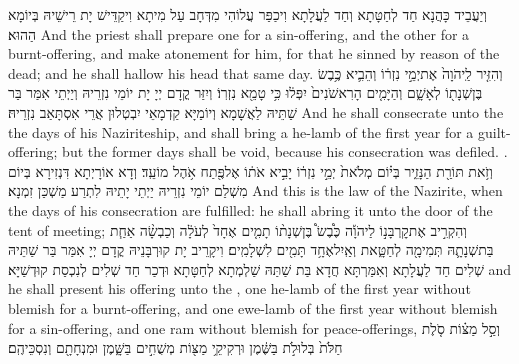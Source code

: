{וְיַעֲבֵיד כָּהֲנָא חַד לְחַטָּתָא וְחַד לַעֲלָתָא וִיכַפַּר עֲלוֹהִי מִדְּחָב עַל מִיתָא וִיקַדֵּישׁ יָת רֵישֵׁיהּ בְּיוֹמָא הַהוּא׃}
{And the priest shall prepare one for a sin-offering, and the other for a burnt-offering, and make atonement for him, for that he sinned by reason of the dead; and he shall hallow his head that same day.}{}
{וְהִזִּ֤יר לַֽיהֹוָה֙ אֶת\maqqaf יְמֵ֣י נִזְר֔וֹ וְהֵבִ֛יא כֶּ֥בֶשׂ בֶּן\maqqaf שְׁנָת֖וֹ לְאָשָׁ֑ם וְהַיָּמִ֤ים הָרִאשֹׁנִים֙ יִפְּל֔וּ כִּ֥י טָמֵ֖א נִזְרֽוֹ׃}
{וְיִזַּר קֳדָם יְיָ יָת יוֹמֵי נִזְרֵיהּ וְיַיְתֵי אִמַּר בַּר שַׁתֵּיהּ לַאֲשָׁמָא וְיוֹמַיָּא קַדְמָאֵי יִבְטְלוּן אֲרֵי אִסְתָּאַב נִזְרֵיהּ׃}
{And he shall consecrate unto the \lord\space the days of his Naziriteship, and shall bring a he-lamb of the first year for a guilt-offering; but the former days shall be void, because his consecration was defiled. .}{}
{וְזֹ֥את תּוֹרַ֖ת הַנָּזִ֑יר בְּי֗וֹם מְלֹאת֙ יְמֵ֣י נִזְר֔וֹ יָבִ֣יא אֹת֔וֹ אֶל\maqqaf פֶּ֖תַח אֹ֥הֶל מוֹעֵֽד׃}
{וְדָא אוֹרָיְתָא דִּנְזִירָא בְּיוֹם מִשְׁלַם יוֹמֵי נִזְרֵיהּ יַיְתֵי יָתֵיהּ לִתְרַע מַשְׁכַּן זִמְנָא׃}
{And this is the law of the Nazirite, when the days of his consecration are fulfilled: he shall abring it unto the door of the tent of meeting;}{}
{וְהִקְרִ֣יב אֶת\maqqaf קׇרְבָּנ֣וֹ לַיהֹוָ֡ה כֶּ֩בֶשׂ֩ בֶּן\maqqaf שְׁנָת֨וֹ תָמִ֤ים אֶחָד֙ לְעֹלָ֔ה וְכַבְשָׂ֨ה אַחַ֧ת בַּת\maqqaf שְׁנָתָ֛הּ תְּמִימָ֖ה לְחַטָּ֑את וְאַֽיִל\maqqaf אֶחָ֥ד תָּמִ֖ים לִשְׁלָמִֽים׃}
{וִיקָרֵיב יָת קוּרְבָּנֵיהּ קֳדָם יְיָ אִמַּר בַּר שַׁתֵּיהּ שְׁלִים חַד לַעֲלָתָא וְאִמַּרְתָּא חֲדָא בַּת שַׁתַּהּ שַׁלְמְתָא לְחַטָּתָא וּדְכַר חַד שְׁלִים לְנִכְסַת קוּדְשַׁיָּא׃}
{and he shall present his offering unto the \lord, one he-lamb of the first year without blemish for a burnt-offering, and one ewe-lamb of the first year without blemish for a sin-offering, and one ram without blemish for peace-offerings,}{}
{וְסַ֣ל מַצּ֗וֹת סֹ֤לֶת חַלֹּת֙ בְּלוּלֹ֣ת בַּשֶּׁ֔מֶן וּרְקִיקֵ֥י מַצּ֖וֹת מְשֻׁחִ֣ים בַּשָּׁ֑מֶן וּמִנְחָתָ֖ם וְנִסְכֵּיהֶֽם׃}

